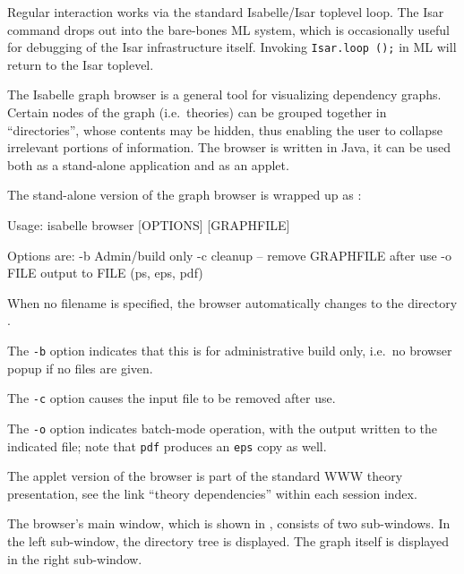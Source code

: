 \begin{isabellebody}
\begin{isamarkuptext}
  Regular interaction works via the standard Isabelle/Isar toplevel
  loop.  The Isar command \hyperlink{command.exit}{\mbox{}} drops out into the
  bare-bones ML system, which is occasionally useful for debugging of
  the Isar infrastructure itself.  Invoking \verb|Isar.loop|~\verb|();| in ML will return to the Isar toplevel.%
\end{isamarkuptext}%
\isamarkuptrue%
%
\isamarkuptrue%
%
\begin{isamarkuptext}%
The Isabelle graph browser is a general tool for visualizing
  dependency graphs.  Certain nodes of the graph (i.e.\ theories) can
  be grouped together in ``directories'', whose contents may be
  hidden, thus enabling the user to collapse irrelevant portions of
  information.  The browser is written in Java, it can be used both as
  a stand-alone application and as an applet.%
\end{isamarkuptext}%
\isamarkuptrue%
%
\isamarkuptrue%
%
\begin{isamarkuptext}%
The stand-alone version of the graph browser is wrapped up as
  \hypertarget{tool.browser}{\hyperlink{tool.browser}{\mbox{}}}:
\begin{ttbox}
Usage: isabelle browser [OPTIONS] [GRAPHFILE]

  Options are:
    -b           Admin/build only
    -c           cleanup -- remove GRAPHFILE after use
    -o FILE      output to FILE (ps, eps, pdf)
\end{ttbox}
  When no filename is specified, the browser automatically changes to
  the directory \hyperlink{setting.ISABELLE-BROWSER-INFO}{\mbox{}}.

  \medskip The \verb|-b| option indicates that this is for
  administrative build only, i.e.\ no browser popup if no files are
  given.

  The \verb|-c| option causes the input file to be removed
  after use.

  The \verb|-o| option indicates batch-mode operation, with the
  output written to the indicated file; note that \verb|pdf|
  produces an \verb|eps| copy as well.

  \medskip The applet version of the browser is part of the standard
  WWW theory presentation, see the link ``theory dependencies'' within
  each session index.%
\end{isamarkuptext}%
\isamarkuptrue%
%
\isamarkuptrue%
%
\begin{isamarkuptext}%
The browser's main window, which is shown in
  , consists of two sub-windows.  In the
  left sub-window, the directory tree is displayed. The graph itself
  is displayed in the right sub-window.


\end{isamarkuptext}
\end{isabellebody}
